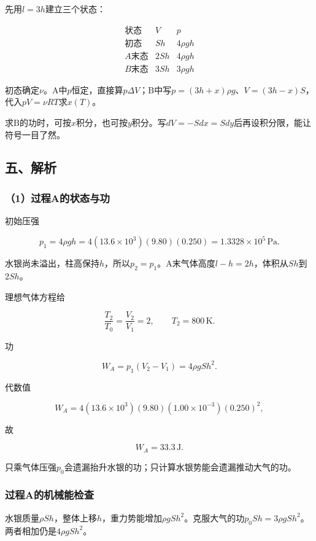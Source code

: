 \documentclass[12pt,a4paper,fontset=fandol]{ctexart}
\begin{document}
先用\(l=3h\)建立三个状态：

\[
\begin{array}{c|c|c}
\text{状态}&V&p\\ \hline
\text{初态}&Sh&4\rho gh\\
A\text{末态}&2Sh&4\rho gh\\
B\text{末态}&3Sh&3\rho gh
\end{array}
\]

初态确定\(\nu\)。A中\(p\)恒定，直接算\(p\Delta V\)；B中写\(p=(3h+x)\rho g\)、\(V=(3h-x)S\)，代入\(pV=\nu RT\)求\(x(T)\)。

求B的功时，可按\(x\)积分，也可按\(y\)积分。写\(dV=-Sdx=Sdy\)后再设积分限，能让符号一目了然。

\subsection{五、解析}\label{ux4e94ux89e3ux6790-1}

\subsubsection{（1）过程A的状态与功}\label{ux8fc7ux7a0baux7684ux72b6ux6001ux4e0eux529f}

初始压强

\[
p_1=4\rho gh
=4(13.6\times10^3)(9.80)(0.250)
=1.3328\times10^5\,\mathrm{Pa}.
\]

水银尚未溢出，柱高保持\(h\)，所以\(p_2=p_1\)。A末气体高度\(l-h=2h\)，体积从\(Sh\)到\(2Sh\)。

理想气体方程给

\[
\frac{T_2}{T_0}=\frac{V_2}{V_1}=2,
\qquad T_2=800\,\mathrm K.
\]

功

\[
W_A=p_1(V_2-V_1)=4\rho gSh^2.
\]

代数值

\[
W_A=4(13.6\times10^3)(9.80)
(1.00\times10^{-3})(0.250)^2,
\]

故

\[
\boxed{W_A=33.3\,\mathrm J}.
\]

只乘气体压强\(p_0\)会遗漏抬升水银的功；只计算水银势能会遗漏推动大气的功。

\subsubsection{过程A的机械能检查}\label{ux8fc7ux7a0baux7684ux673aux68b0ux80fdux68c0ux67e5}

水银质量\(\rho Sh\)，整体上移\(h\)，重力势能增加\(\rho gSh^2\)。克服大气的功\(p_0Sh=3\rho gSh^2\)。两者相加仍是\(4\rho gSh^2\)。
\end{document}
